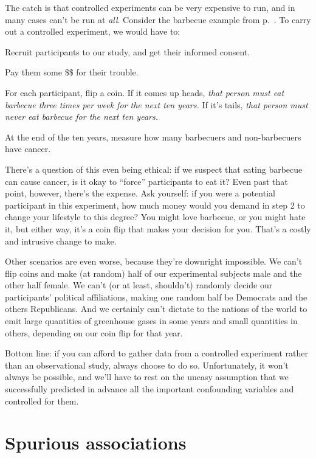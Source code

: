 The catch is that controlled experiments can be very expensive to run, and in
many cases can't be run at \textit{all}. Consider the barbecue example from
p.~\pageref{barbecue}. To carry out a controlled experiment, we would have to:

\begin{compactenum}
\item Recruit participants to our study, and get their informed consent.
\item Pay them some \$\$ for their trouble.
\item For each participant, flip a coin. If it comes up heads, \textit{that
person must eat barbecue three times per week for the next ten years.} If it's
tails, \textit{that person must never eat barbecue for the next ten years.}
\item At the end of the ten years, measure how many barbecuers and
non-barbecuers have cancer.
\end{compactenum}

There's a question of this even being ethical: if we suspect that eating
barbecue can cause cancer, is it okay to ``force'' participants to eat it? Even
past that point, however, there's the expense. Ask yourself: if you were a
potential participant in this experiment, how much money would you demand in
step 2 to change your lifestyle to this degree? You might love barbecue, or you
might hate it, but either way, it's a coin flip that makes your decision for
you. That's a costly and intrusive change to make.

Other scenarios are even worse, because they're downright impossible. We can't
flip coins and make (at random) half of our experimental subjects male
and the other half female. We can't (or at least, shouldn't) randomly decide
our participants' political affiliations, making one random half be Democrats
and the others Republicans. And we certainly can't dictate to the nations of
the world to emit large quantities of greenhouse gases in some years and small
quantities in others, depending on our coin flip for that year.

Bottom line: if you can afford to gather data from a controlled experiment
rather than an observational study, always choose to do so. Unfortunately, it
won't always be possible, and we'll have to rest on the uneasy assumption that
we successfully predicted in advance all the important confounding variables
and controlled for them.

\section{Spurious associations}

